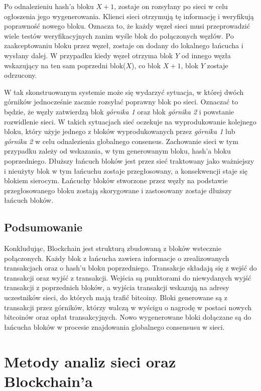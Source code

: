 \documentclass[12pt, oneside, final, openany]{mgr}
\begin{document}
\indent Po odnalezieniu hash'a bloku $X+1$, zostaje on rozsyłany po sieci w celu ogłoszenia jego wygenerowania. Klienci sieci otrzymują tę informację i weryfikują poprawność nowego bloku. Oznacza to, że każdy węzeł sieci musi przeprowadzić wiele testów weryfikacyjnych zanim wyśle blok do połączonych węzłów. Po zaakceptowaniu bloku przez węzeł, zostaje on dodany do lokalnego łańcucha i wysłany dalej. W przypadku kiedy węzeł otrzyma blok $Y$ od innego węzła wskazujący na ten sam poprzedni blok($X$), co blok $X+1$, blok $Y$ zostaje odrzucony.

\indent W tak skonstruowanym systemie może się wydarzyć sytuacja, w której dwóch górników jednocześnie zacznie rozsyłać poprawny blok po sieci. Oznaczać to będzie, że węzły zatwierdzą blok \textit{górnika 1} oraz blok \textit{górnika 2} i powstanie rozwidlenie sieci. W takich sytuacjach sieć oczekuje na wyprodukowanie kolejnego bloku, który użyje jednego z bloków wyprodukowanych przez \textit{górnika 1} lub \textit{górnika 2} w celu odnalezienia globalnego consensus. Zachowanie sieci w tym przypadku zależy od wskazania, w tym generowanym bloku, hash'a bloku poprzedniego. Dłuższy łańcuch bloków jest przez sieć traktowany jako ważniejszy i nieużyty blok w tym łańcuchu zostaje przegłosowany, a konsekwencji staje się blokiem sierocym. Łańcuchy bloków stworzone przez węzły na podstawie przegłosowanego bloku zostają skorygowane i zastosowany zostaje dłuższy łańcuch bloków.

\section{Podsumowanie}

\indent Konkludując, Blockchain jest strukturą zbudowaną z bloków wstecznie połączonych. Każdy blok z łańcucha zawiera informacje o zrealizowanych transakcjach oraz o hash'u bloku poprzedniego. Transakcje składają się z wejść do transakcji oraz wyjść z transakcji. Wejścia są punktorami do niewydanych wyjść transakcji z poprzednich bloków, a wyjścia transakcji wskazują na adresy uczestników sieci, do których mają trafić bitcoiny. Bloki generowane są z transakcji przez górników, którzy walczą w wyścigu o nagrodę w postaci nowych bitcoinów oraz opłat transakcyjnych. Nowo wygenerowane bloki dołączane są do łańcucha bloków w procesie znajdowania globalnego consensusu w sieci.

\chapter{Metody analiz sieci oraz Blockchain'a}
\label{przegladAnalizy}
\end{document}
